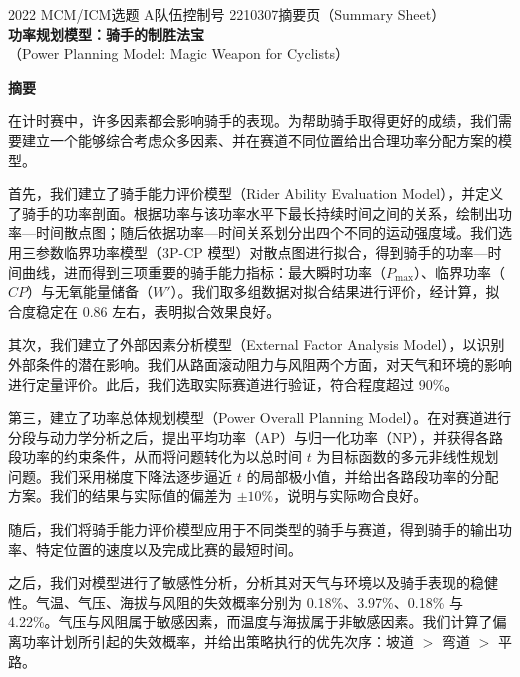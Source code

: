 \documentclass[11pt,a4paper]{ctexart}
\begin{document}
\thispagestyle{empty}
\begin{center}
{\small 2022 MCM/ICM\quad 选题 A\quad 队伍控制号 2210307\quad 摘要页（Summary Sheet）}\\[18pt]
{\LARGE\bfseries 功率规划模型：骑手的制胜法宝}\\[8pt]
{\large （Power Planning Model: Magic Weapon for Cyclists）}\\[10pt]
\end{center}

\begin{center}
{\large\bfseries 摘\quad 要}
\end{center}

\vspace{6pt}
在计时赛中，许多因素都会影响骑手的表现。为帮助骑手取得更好的成绩，我们需要建立一个能够综合考虑众多因素、并在赛道不同位置给出合理功率分配方案的模型。

首先，我们建立了骑手能力评价模型（Rider Ability Evaluation Model），并定义了骑手的功率剖面。根据功率与该功率水平下最长持续时间之间的关系，绘制出功率—时间散点图；随后依据功率—时间关系划分出四个不同的运动强度域。我们选用三参数临界功率模型（3P-CP 模型）对散点图进行拟合，得到骑手的功率—时间曲线，进而得到三项重要的骑手能力指标：最大瞬时功率（$P_{\max}$）、临界功率（$CP$）与无氧能量储备（$W'$）。我们取多组数据对拟合结果进行评价，经计算，拟合度稳定在 0.86 左右，表明拟合效果良好。

其次，我们建立了外部因素分析模型（External Factor Analysis Model），以识别外部条件的潜在影响。我们从路面滚动阻力与风阻两个方面，对天气和环境的影响进行定量评价。此后，我们选取实际赛道进行验证，符合程度超过 90\%。

第三，建立了功率总体规划模型（Power Overall Planning Model）。在对赛道进行分段与动力学分析之后，提出平均功率（AP）与归一化功率（NP），并获得各路段功率的约束条件，从而将问题转化为以总时间 $t$ 为目标函数的多元非线性规划问题。我们采用梯度下降法逐步逼近 $t$ 的局部极小值，并给出各路段功率的分配方案。我们的结果与实际值的偏差为 $\pm 10\%$，说明与实际吻合良好。

随后，我们将骑手能力评价模型应用于不同类型的骑手与赛道，得到骑手的输出功率、特定位置的速度以及完成比赛的最短时间。

之后，我们对模型进行了敏感性分析，分析其对天气与环境以及骑手表现的稳健性。气温、气压、海拔与风阻的失效概率分别为 0.18\%、3.97\%、0.18\% 与 4.22\%。气压与风阻属于敏感因素，而温度与海拔属于非敏感因素。我们计算了偏离功率计划所引起的失效概率，并给出策略执行的优先次序：坡道 $>$ 弯道 $>$ 平路。
\end{document}
